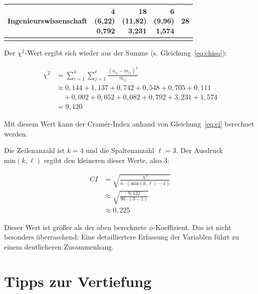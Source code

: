 \documentclass[
  11pt,
  ngerman,
  a4paper,
]{report}
\begin{document}
\begin{table}[H]
\begin{tabular}[t]{>{}r|rr>{}r|>{}r}
\textbf{Ingenieurswissenschaft} & \makecell[tr]{4\\(6,22)\\\textcolor{goethe_blue}{0,792}} & \makecell[tr]{18\\(11,82)\\\textcolor{goethe_blue}{3,231}} & \makecell[tr]{6\\(9,96)\\\textcolor{goethe_blue}{1,574}} & \textbf{28}\\
\midrule
\cellcolor{gray!6}{\textbf{\textbf{}}} & \cellcolor{gray!6}{\textbf{20}} & \cellcolor{gray!6}{\textbf{38}} & \cellcolor{gray!6}{\textbf{32}} & \cellcolor{gray!6}{\textbf{\textbf{90}}}\\
\bottomrule
\end{tabular}
\end{table}

Der \(\chi^2\)-Wert ergibt sich wieder aus der Summe (s. Gleichung~\eqref{eq:chisq}):

\nopagebreak

\[
\begin{aligned}
\chi^2&= \sum_{i=1}^{k}\sum_{j=1}^{\ell}\frac{(n_{ij}-m_{ij})^{2}}{m_{ij}}\\[4pt]
&\approx 0{,}144+1{,}137+0{,}742+0{,}548+0{,}705+0{,}111\\&\quad+0{,}002+0{,}052+0{,}082+0{,}792+3{,}231+1{,}574 \\
& =9{,}120
\end{aligned}
\]

Mit diesem Wert kann der Cramér-Index anhand von Gleichung~\eqref{eq:ci} berechnet werden.

Die Zeilenanzahl ist \(k=4\) und die Spaltenanzahl \(\ell=3\). Der Ausdruck \(\mathrm{min}(k,\ell)\) ergibt den kleineren dieser Werte, also 3:

\[
\begin{aligned}
\mathit{CI}&=\sqrt{\frac{\chi^2}{n\cdot (\mathrm{min}(k, \ell)-1)}}\\[6pt]
&\approx\sqrt{\frac{9{,}122}{90\cdot(3-1)}}\\[4pt]
&\approx0{,}225
\end{aligned}
\]

Dieser Wert ist größer als der oben berechnete \(\phi\)-Koeffizient. Das ist nicht besonders überraschend: Eine detailliertere Erfassung der Variablen führt zu einem deutlicheren Zusammenhang.

\hypertarget{tipps-zur-vertiefung-8}{%
\section*{Tipps zur Vertiefung}\label{tipps-zur-vertiefung-8}}
\end{document}
